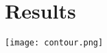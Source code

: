 \documentclass{report}
\begin{document}
\section{Results}
\texttt{[image: contour.png]}
\end{document}
